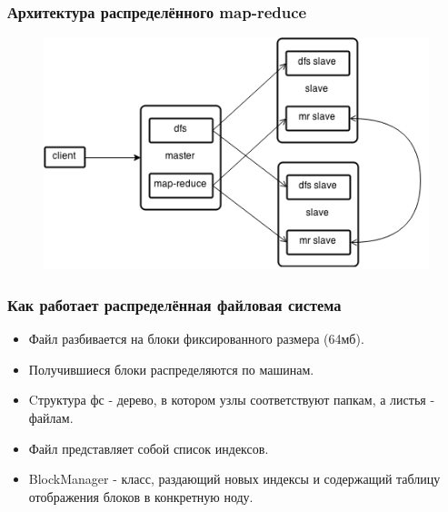 \documentclass{beamer}
\begin{document}
    \begin{frame}
    \frametitle{Архитектура распределённого map-reduce}
        \begin{figure}[h!]
            \begin{center}
                \includegraphics[scale=0.5]{map-reduce.png}
            \end{center}
        \end{figure}        
    \end{frame}


    \begin{frame}
    \frametitle{Как работает распределённая файловая система}
        \begin{itemize}
            \item Файл разбивается на блоки фиксированного размера (64мб).
            \item Получившиеся блоки распределяются по машинам.
            \item Cтруктура фс - дерево, в котором узлы соответствуют папкам, а листья - файлам.
            \item Файл представляет собой список индексов.
            \item BlockManager - класс, раздающий новых индексы и содержащий таблицу отображения блоков в конкретную ноду.
        \end{itemize}
    \end{frame}
\end{document}
